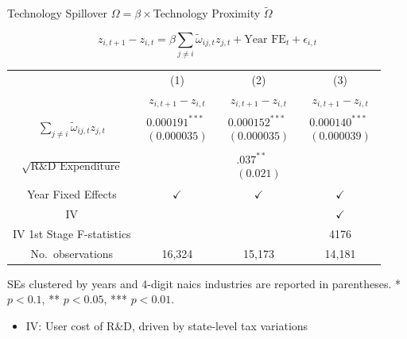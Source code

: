 \documentclass[
  aspectratio=169,  %
  handout           %
]{beamer}
\theoremstyle{plain}
\begin{document}
\begin{frame}{Technology Spillover $\Omega=\beta\times$Technology Proximity $\tilde{\Omega}$ \hyperlink{first_stage}{}}
  
  {\footnotesize
  \vspace{-5mm}
  \label{regression}

  \[
    z_{i,t+1}-z_{i,t}
      =\beta\sum_{j\neq i}\tilde{\omega}_{ij,t}z_{j,t}
      +\text{Year FE}_{t}
      +\epsilon_{i,t}
  \]
  \begin{center}
    \setlength{\tabcolsep}{3pt}
    \begin{tabular}{cccc}
      \hline\hline
       & (1) & (2) & (3) \\ 
       & $z_{i,t+1}-z_{i,t}$ 
       & $z_{i,t+1}-z_{i,t}$ 
       & $z_{i,t+1}-z_{i,t}$ \\
      \hline
      $\sum_{j\neq i}\tilde{\omega}_{ij,t}z_{j,t}$
        & $\begin{array}{c}\text{0.000191}^{***}\\(\text{0.000035})\end{array}$
        & $\begin{array}{c}\text{0.000152}^{***}\\(\text{0.000035})\end{array}$
        & $\begin{array}{c}\text{0.000140}^{***}\\(\text{0.000039})\end{array}$ \\

      $\sqrt{\text{R\&D Expenditure}}$
        & 
        & $\begin{array}{c}\text{.037}^{**}\\(\text{0.021})\end{array}$
        &  \\

      \hline
      Year Fixed Effects                & $\checkmark$ & $\checkmark$ & $\checkmark$ \\
      IV                                &            &            & $\checkmark$ \\
      IV 1st Stage F-statistics        &            &            & 4176        \\
      No.\ observations                & 16,324     & 15,173     & 14,181      \\
      \hline
    \end{tabular}
  \end{center}

  SEs clustered by years and 4-digit naics industries are reported in parentheses. 
  {*} $p<\text{0.1}$, {**} $p<\text{0.05}$, {***} $p<\text{0.01}$.}
\begin{itemize}
  \item IV: User cost of R\&D, driven by state-level tax variations \citep{Wilson2009-ri,Bloom2013-pn}
\end{itemize}
\end{frame}
\end{document}

